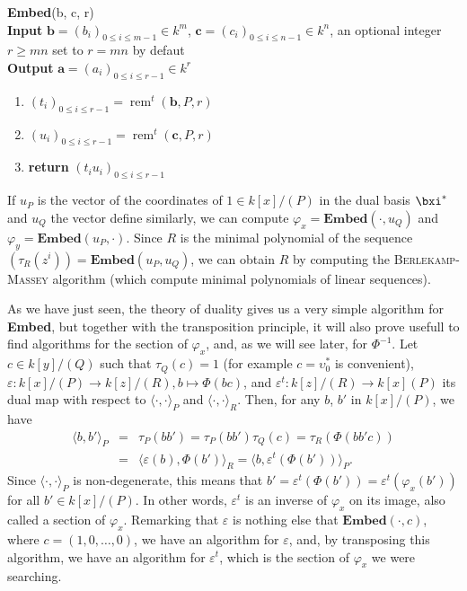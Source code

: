 \documentclass[a4paper,11pt]{article}
\theoremstyle{break}
\theoremstyle{definition}
\theoremstyle{remark}
\DeclareMathOperator{\rem}{rem}
\newcommand{\ps}[2]{\langle#1,#2\rangle}
\newcommand{\psdot}{\ps{\cdot}{\cdot}}
\newcommand{\remt}{\rem^t}
\begin{document}
\textbf{Embed}(b, c, r)\\
\textbf{Input} $\textbf{b}=(b_i)_{0\leq i\leq m-1}\in k^m$,
$\textbf{c}=(c_i)_{0\leq i\leq n-1}\in k^n$, an optional integer $r\geq mn$ set
to $r=mn$ by defaut\\
\textbf{Output} $\textbf{a}=(a_i)_{0\leq i\leq r-1}\in k^r$
\begin{enumerate}
  \item $(t_i)_{0\leq i \leq r-1}=\remt(\textbf{b},P,r)$
  \item $(u_i)_{0\leq i \leq r-1}=\remt(\textbf{c},P,r)$
  \item \textbf{return} $(t_iu_i)_{0\leq i \leq r-1}$
\end{enumerate}
If $u_P$ is the vector of the coordinates of $1\in k[x]/(P)$ in the dual basis
$\bxi^*$ and $u_Q$ the vector define similarly, we can compute
$\varphi_x=\textbf{Embed}(\cdot,u_Q)$ and $\varphi_y=\textbf{Embed}(u_P,\cdot)$.
Since $R$ is the minimal polynomial of the sequence
$(\tau_R(z^i))=\textbf{Embed}(u_P,u_Q)$, we can obtain $R$ by computing the
\textsc{Berlekamp-Massey} algorithm (which compute minimal polynomials of linear
sequences).

As we have just seen, the theory of duality gives us a very simple algorithm for
\textbf{Embed}, but together with the transposition principle, it will also
prove usefull to find algorithms for the section of $\varphi_x$, and, as we will
see later, for $\Phi^{-1}$. Let $c\in k[y]/(Q)$ such that $\tau_Q(c)=1$ (for
example $c=\upsilon^*_0$ is convenient), $\varepsilon:k[x]/(P)\to k[z]/(R),
b\mapsto \Phi(bc)$, and $\varepsilon^t:k[z]/(R)\to k[x](P)$ its dual map with
respect to $\psdot_P$ and $\psdot_R$. Then, for any $b$, $b'$ in $k[x]/(P)$, we
have
\[
\begin{array}{rcl}
  \ps{b}{b'}_P &=& \tau_P(bb') = \tau_P(bb')\tau_Q(c) = \tau_R(\Phi(bb'c))\\
  &=& \ps{\varepsilon(b)}{\Phi(b')}_R = \ps{b}{\varepsilon^t(\Phi(b'))}_P.
\end{array}
\]
Since $\psdot_P$ is non-degenerate, this means that 
$b'=\varepsilon^t(\Phi(b'))=\varepsilon^t(\varphi_x(b'))$ for all $b'\in 
k[x]/(P)$. In other words, $\varepsilon^t$ is an inverse of $\varphi_x$ on its 
image, also called a section of $\varphi_x$. Remarking that $\varepsilon$ is 
nothing else that $\textbf{Embed}(\cdot,c)$, where $c=(1,0,\dots,0)$, we have 
an algorithm for $\varepsilon$, and, by transposing this algorithm, we have an 
algorithm for $\varepsilon^t$, which is the section of $\varphi_x$ we were 
searching.
\end{document}
